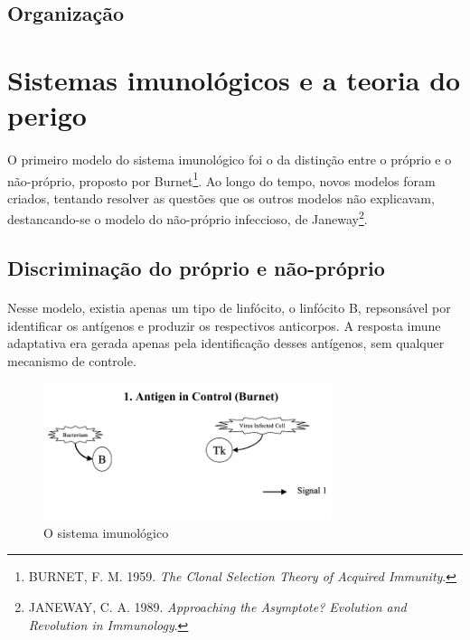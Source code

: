 \documentclass{iiufrgs}
\begin{document}
\subsection{Organização}
\newpage

\section{Sistemas imunológicos e a teoria do perigo}

\paragraph{}O primeiro modelo do sistema imunológico foi o da distinção entre o próprio e o não-próprio, proposto por Burnet\footnote{BURNET, F. M. 1959. \emph{The Clonal Selection Theory of Acquired Immunity}.}. Ao longo do tempo, novos modelos foram criados, tentando resolver as questões que os outros modelos não explicavam, destancando-se o modelo do não-próprio infeccioso, de Janeway\footnote{JANEWAY, C. A. 1989. \emph{Approaching the Asymptote? Evolution and Revolution in Immunology}.}.

\subsection{Discriminação do próprio e não-próprio}

\paragraph{}Nesse modelo, existia apenas um tipo de linfócito, o linfócito B, repsonsável por identificar os antígenos e produzir os respectivos anticorpos. A resposta imune adaptativa era gerada apenas pela identificação desses antígenos, sem qualquer mecanismo de controle.

\begin{figure}[h]
\centering
\includegraphics[width=0.75\textwidth]{img/signals1-antigen.png}
\caption{O sistema imunológico}
\end{figure}
\end{document}
